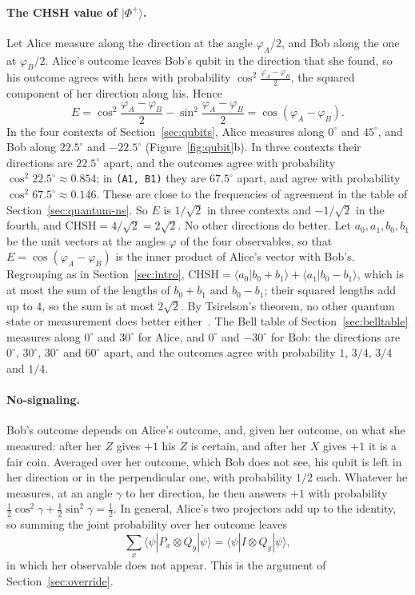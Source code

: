 \documentclass[11pt]{article}
\newcommand{\hs}{\lstinline[style=hask,basicstyle=\ttfamily,frame=none]}
\newcommand{\CHSH}{\mathrm{CHSH}}
\begin{document}
\paragraph{The CHSH value of $|\Phi^+\rangle$.} Let Alice measure along the direction at the angle $\varphi_A/2$, and Bob along the one at $\varphi_B/2$. Alice's outcome leaves Bob's qubit in the direction that she found, so his outcome agrees with hers with probability $\cos^2\frac{\varphi_A - \varphi_B}{2}$, the squared component of her direction along his. Hence
\[
  E = \cos^2\frac{\varphi_A - \varphi_B}{2} - \sin^2\frac{\varphi_A - \varphi_B}{2} = \cos(\varphi_A - \varphi_B).
\]
In the four contexts of Section~\ref{sec:qubits}, Alice measures along $0^\circ$ and $45^\circ$, and Bob along $22.5^\circ$ and $-22.5^\circ$ (Figure~\ref{fig:qubit}b). In three contexts their directions are $22.5^\circ$ apart, and the outcomes agree with probability $\cos^2 22.5^\circ \approx 0.854$; in \hs|(A1, B1)| they are $67.5^\circ$ apart, and agree with probability $\cos^2 67.5^\circ \approx 0.146$. These are close to the frequencies of agreement in the table of Section~\ref{sec:quantum-ns}. So $E$ is $1/\sqrt2$ in three contexts and $-1/\sqrt2$ in the fourth, and $\CHSH = 4/\sqrt2 = 2\sqrt2$. No other directions do better. Let $a_0, a_1, b_0, b_1$ be the unit vectors at the angles $\varphi$ of the four observables, so that $E = \cos(\varphi_A - \varphi_B)$ is the inner product of Alice's vector with Bob's. Regrouping as in Section~\ref{sec:intro}, $\CHSH = \langle a_0|b_0 + b_1\rangle + \langle a_1|b_0 - b_1\rangle$, which is at most the sum of the lengths of $b_0 + b_1$ and $b_0 - b_1$; their squared lengths add up to $4$, so the sum is at most $2\sqrt2$. By Tsirelson's theorem, no other quantum state or measurement does better either~\citep{Tsirelson1980}. The Bell table of Section~\ref{sec:belltable} measures along $0^\circ$ and $30^\circ$ for Alice, and $0^\circ$ and $-30^\circ$ for Bob: the directions are $0^\circ$, $30^\circ$, $30^\circ$ and $60^\circ$ apart, and the outcomes agree with probability $1$, $3/4$, $3/4$ and $1/4$.

\paragraph{No-signaling.} Bob's outcome depends on Alice's outcome, and, given her outcome, on what she measured: after her $Z$ gives $+1$ his $Z$ is certain, and after her $X$ gives $+1$ it is a fair coin. Averaged over her outcome, which Bob does not see, his qubit is left in her direction or in the perpendicular one, with probability $1/2$ each. Whatever he measures, at an angle $\gamma$ to her direction, he then answers $+1$ with probability $\frac12\cos^2\gamma + \frac12\sin^2\gamma = \frac12$. In general, Alice's two projectors add up to the identity, so summing the joint probability over her outcome leaves
\[
  \sum_x \langle\psi|P_x \otimes Q_y|\psi\rangle = \langle\psi|I \otimes Q_y|\psi\rangle,
\]
in which her observable does not appear. This is the argument of Section~\ref{sec:override}.
\end{document}
